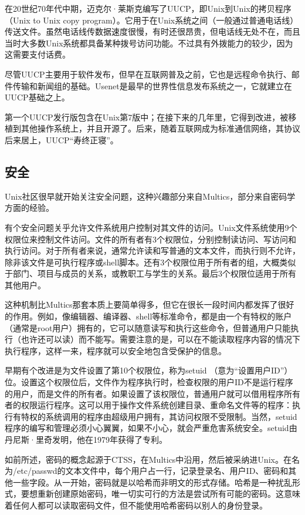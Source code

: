 \documentclass[a4paper,12pt,UTF8,twoside]{ctexbook}
\begin{document}
在20世纪70年代中期，迈克尔·莱斯克编写了UUCP，即Unix到Unix的拷贝程序（Unix to Unix copy program）。它用于在Unix系统之间（一般通过普通电话线）传送文件。虽然电话线传数据速度很慢，有时还很昂贵，但电话线无处不在，而且当时大多数Unix系统都具备某种拨号访问功能。不过具有外拨能力的较少，因为这需要支付话费。

尽管UUCP主要用于软件发布，但早在互联网普及之前，它也是远程命令执行、邮件传输和新闻组的基础。Usenet是最早的世界性信息发布系统之一，它就建立在UUCP基础之上。

第一个UUCP发行版包含在Unix第7版中；在接下来的几年里，它得到改进，被移植到其他操作系统上，并且开源了。后来，随着互联网成为标准通信网络，其协议后来居上，UUCP“寿终正寝”。

\subsection{安全}

Unix社区很早就开始关注安全问题，这种兴趣部分来自Multics，部分来自密码学方面的经验。

有个安全问题关乎允许文件系统用户控制对其文件的访问。Unix文件系统使用9个权限位来控制文件访问。文件的所有者有3个权限位，分别控制读访问、写访问和执行访问。对于所有者来说，通常允许读和写普通的文本文件，而执行则不允许，除非该文件是可执行程序或shell脚本。还有3个权限位用于所有者的组，大概类似于部门、项目与成员的关系，或教职工与学生的关系。最后3个权限位适用于所有其他用户。

这种机制比Multics那套本质上要简单得多，但它在很长一段时间内都发挥了很好的作用。例如，像编辑器、编译器、shell等标准命令，都是由一个有特权的账户（通常是root用户）拥有的，它可以随意读写和执行这些命令，但普通用户只能执行（也许还可以读）而不能写。需要注意的是，可以在不能读取程序内容的情况下执行程序，这样一来，程序就可以安全地包含受保护的信息。

早期有个改进是为文件设置了第10个权限位，称为setuid （意为“设置用户ID”）位。设置这个权限位后，文件作为程序执行时，检查权限的用户ID不是运行程序的用户，而是文件的所有者。如果设置了该权限位，普通用户就可以借用程序所有者的权限运行程序。这可以用于操作文件系统创建目录、重命名文件等的程序：执行有特权的系统调用的程序由超级用户拥有，其访问权限不受限制。当然，setuid程序的编写和管理必须小心翼翼，如果不小心，就会严重危害系统安全。setuid由丹尼斯·里奇发明，他在1979年获得了专利。

如前所述，密码的概念起源于CTSS，在Multics中沿用，然后被采纳进Unix。在名为/etc/passwd的文本文件中，每个用户占一行，记录登录名、用户ID、密码和其他一些字段。从一开始，密码就是以哈希而非明文的形式存储。哈希是一种扰乱形式，要想重新创建原始密码，唯一切实可行的方法是尝试所有可能的密码。这意味着任何人都可以读取密码文件，但不能使用哈希密码以别人的身份登录。
\end{document}
